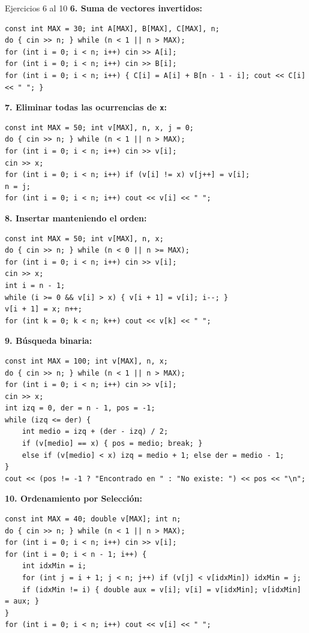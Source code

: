 \documentclass[11pt,letterpaper]{article}
\begin{document}
\begin{solucion}{Ejercicios 6 al 10}
\textbf{6. Suma de vectores invertidos:}
\begin{lstlisting}[style=cppmonitoria]
const int MAX = 30; int A[MAX], B[MAX], C[MAX], n;
do { cin >> n; } while (n < 1 || n > MAX);
for (int i = 0; i < n; i++) cin >> A[i];
for (int i = 0; i < n; i++) cin >> B[i];
for (int i = 0; i < n; i++) { C[i] = A[i] + B[n - 1 - i]; cout << C[i] << " "; }
\end{lstlisting}

\textbf{7. Eliminar todas las ocurrencias de \texttt{x}:}
\begin{lstlisting}[style=cppmonitoria]
const int MAX = 50; int v[MAX], n, x, j = 0;
do { cin >> n; } while (n < 1 || n > MAX);
for (int i = 0; i < n; i++) cin >> v[i];
cin >> x;
for (int i = 0; i < n; i++) if (v[i] != x) v[j++] = v[i];
n = j;
for (int i = 0; i < n; i++) cout << v[i] << " ";
\end{lstlisting}

\textbf{8. Insertar manteniendo el orden:}
\begin{lstlisting}[style=cppmonitoria]
const int MAX = 50; int v[MAX], n, x;
do { cin >> n; } while (n < 0 || n >= MAX);
for (int i = 0; i < n; i++) cin >> v[i];
cin >> x;
int i = n - 1;
while (i >= 0 && v[i] > x) { v[i + 1] = v[i]; i--; }
v[i + 1] = x; n++;
for (int k = 0; k < n; k++) cout << v[k] << " ";
\end{lstlisting}

\textbf{9. Búsqueda binaria:}
\begin{lstlisting}[style=cppmonitoria]
const int MAX = 100; int v[MAX], n, x;
do { cin >> n; } while (n < 1 || n > MAX);
for (int i = 0; i < n; i++) cin >> v[i];
cin >> x;
int izq = 0, der = n - 1, pos = -1;
while (izq <= der) {
    int medio = izq + (der - izq) / 2;
    if (v[medio] == x) { pos = medio; break; }
    else if (v[medio] < x) izq = medio + 1; else der = medio - 1;
}
cout << (pos != -1 ? "Encontrado en " : "No existe: ") << pos << "\n";
\end{lstlisting}

\textbf{10. Ordenamiento por Selección:}
\begin{lstlisting}[style=cppmonitoria]
const int MAX = 40; double v[MAX]; int n;
do { cin >> n; } while (n < 1 || n > MAX);
for (int i = 0; i < n; i++) cin >> v[i];
for (int i = 0; i < n - 1; i++) {
    int idxMin = i;
    for (int j = i + 1; j < n; j++) if (v[j] < v[idxMin]) idxMin = j;
    if (idxMin != i) { double aux = v[i]; v[i] = v[idxMin]; v[idxMin] = aux; }
}
for (int i = 0; i < n; i++) cout << v[i] << " ";
\end{lstlisting}
\end{solucion}
\end{document}
